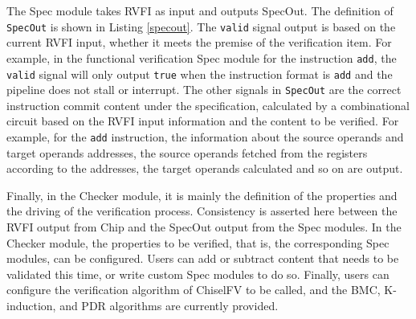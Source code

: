 \documentclass[conference]{IEEEtran}
\theoremstyle{definition}
\begin{document}
The Spec module takes RVFI as input and outputs SpecOut.
The definition of \verb|SpecOut| is shown in Listing \ref{specout}.
The \verb|valid| signal output is based on the current RVFI input, whether it meets the premise of the verification item.
For example, in the functional verification Spec module for the instruction \verb|add|, the \verb|valid| signal will only output \verb|true| when the instruction format is \verb|add| and the pipeline does not stall or interrupt.
The other signals in \verb|SpecOut| are the correct instruction commit content under the specification, calculated by a combinational circuit based on the RVFI input information and the content to be verified.
For example, for the \verb|add| instruction, the information about the source operands and target operands addresses, the source operands fetched from the registers according to the addresses, the target operands calculated and so on are output.

Finally, in the Checker module, it is mainly the definition of the properties and the driving of the verification process.
Consistency is asserted here between the RVFI output from Chip and the SpecOut output from the Spec modules.
In the Checker module, the properties to be verified, that is, the corresponding Spec modules, can be configured.
Users can add or subtract content that needs to be validated this time, or write custom Spec modules to do so.
Finally, users can configure the verification algorithm of ChiselFV to be called, and the BMC, K-induction, and PDR algorithms are currently provided.
\end{document}
